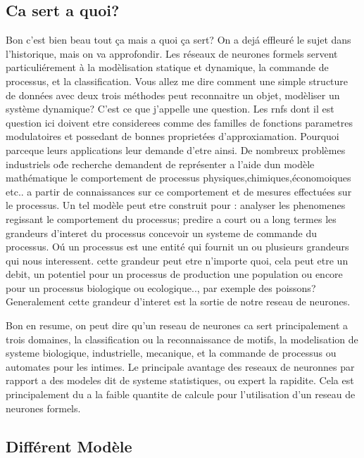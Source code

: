 \documentclass[a4paper,12pt]{report}
\begin{document}
\subsection{Ca sert a quoi?}
Bon c'est bien beau tout \c ca mais a quoi  \c ca sert? On a
dej\'a effleur\'e le sujet dans l'historique, mais on va
approfondir. Les r\'eseaux de neurones formels servent
particuli\'erement \`a la mod\`elisation statique et dynamique, la
commande de processus, et la classification. Vous allez me dire
comment une simple structure de donn\'ees avec deux trois m\'ethodes
peut reconnaitre un objet, mod\`eliser un syst\`eme dynamique? C'est
ce que j'appelle une question.
Les rnfs dont il est question ici doivent etre considerees comme des familles de fonctions parametres
modulatoires et possedant de bonnes propriet\'ees
d'approxiamation. Pourquoi parceque leurs applications leur demande
d'etre ainsi.
De nombreux probl\`emes industriels o\' de recherche demandent de
repr\'esenter a l'aide dun mod\`ele math\'ematique le comportement de
processus physiques,chimiques,\'economoiques etc.. a partir de
connaissances sur ce comportement et de mesures effectu\'ees
sur le processus. Un tel mod\`ele peut etre construit pour :
analyser les phenomenes regissant le comportement du processus;
predire a court ou a long termes les grandeurs d'interet du processus
concevoir un systeme de commande du processus.
O\'u un processus est une entit\'e qui fournit un ou plusieurs
grandeurs qui nous interessent. cette grandeur peut etre n'importe
quoi, cela peut etre un debit, un
potentiel pour un processus de production une population ou encore
pour un processus biologique ou ecologique.., par exemple des poissons?
Generalement cette grandeur d'interet est la sortie de notre reseau de
neurones.

Bon en resume, on peut dire qu'un reseau de neurones ca sert
principalement a trois domaines, la classification ou la
reconnaissance de motifs, la modelisation de systeme biologique,
industrielle, mecanique, et la commande de processus ou automates pour
les intimes. Le principale avantage des reseaux de neuronnes par
rapport a des modeles dit de systeme statistiques, ou expert la
rapidite. Cela est principalement du a la faible quantite de calcule
pour l'utilisation  d'un reseau de neurones formels.
\subsection{Diff\'erent Mod\`ele}
\end{document}
